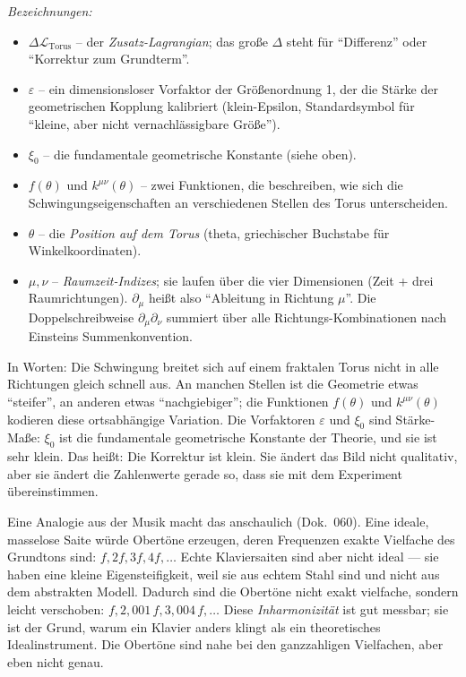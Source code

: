 \noindent\textit{Bezeichnungen:}
\begin{itemize}\setlength\itemsep{0pt}
  \item $\Delta\mathcal{L}_{\text{Torus}}$ -- der \emph{Zusatz-Lagrangian};
        das große $\Delta$ steht für \enquote{Differenz} oder
        \enquote{Korrektur zum Grundterm}.
  \item $\varepsilon$ -- ein dimensionsloser Vorfaktor der Größenordnung 1,
        der die Stärke der geometrischen Kopplung kalibriert (klein-Epsilon,
        Standardsymbol für \enquote{kleine, aber nicht vernachlässigbare Größe}).
  \item $\xi_0$ -- die fundamentale geometrische Konstante (siehe oben).
  \item $f(\theta)$ und $k^{\mu\nu}(\theta)$ -- zwei Funktionen, die
        beschreiben, wie sich die Schwingungseigenschaften an verschiedenen
        Stellen des Torus unterscheiden.
  \item $\theta$ -- die \emph{Position auf dem Torus} (theta, griechischer
        Buchstabe für Winkelkoordinaten).
  \item $\mu, \nu$ -- \emph{Raumzeit-Indizes}; sie laufen über die vier
        Dimensionen (Zeit + drei Raumrichtungen). $\partial_\mu$ heißt
        also \enquote{Ableitung in Richtung $\mu$}. Die Doppelschreibweise
        $\partial_\mu\partial_\nu$ summiert über alle Richtungs-Kombinationen
        nach Einsteins Summenkonvention.
\end{itemize}

\medskip\noindent
In Worten: Die Schwingung breitet sich auf einem fraktalen Torus
nicht in alle Richtungen gleich schnell aus. An manchen Stellen ist
die Geometrie etwas \enquote{steifer}, an anderen etwas
\enquote{nachgiebiger}; die Funktionen $f(\theta)$ und
$k^{\mu\nu}(\theta)$ kodieren diese ortsabhängige Variation. Die
Vorfaktoren $\varepsilon$ und $\xi_0$ sind Stärke-Maße: $\xi_0$ ist
die fundamentale geometrische Konstante der Theorie, und sie ist
sehr klein. Das heißt: Die Korrektur ist klein. Sie ändert das
Bild nicht qualitativ, aber sie ändert die Zahlenwerte gerade so,
dass sie mit dem Experiment übereinstimmen.

Eine Analogie aus der Musik macht das anschaulich (Dok.~060). Eine
ideale, masselose Saite würde Obertöne erzeugen, deren Frequenzen
exakte Vielfache des Grundtons sind: $f, 2f, 3f, 4f, \ldots$ Echte
Klaviersaiten sind aber nicht ideal --- sie haben eine kleine
Eigensteifigkeit, weil sie aus echtem Stahl sind und nicht aus dem
abstrakten Modell. Dadurch sind die Obertöne nicht exakt vielfache,
sondern leicht verschoben: $f, 2{,}001\,f, 3{,}004\,f, \ldots$ Diese
\emph{Inharmonizität} ist gut messbar; sie ist der Grund, warum ein
Klavier anders klingt als ein theoretisches Idealinstrument. Die
Obertöne sind nahe bei den ganzzahligen Vielfachen, aber eben nicht
genau.

